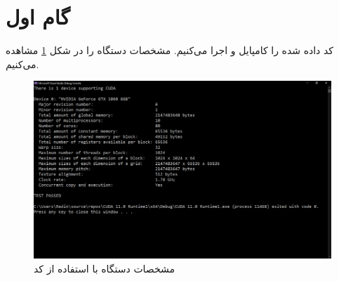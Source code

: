 \documentclass{HW}
\begin{document}
\pagestyle{pages}
\thispagestyle{first_page}

\section{گام اول}

کد  داده شده را کامپایل و اجرا می‌کنیم. مشخصات دستگاه را در شکل
\ref{fig:query}
مشاهده می‌کنیم.

\begin{figure}[ht!]
\begin{center}
	\includegraphics[width=15cm]{images/query}
\end{center}
\caption{مشخصات دستگاه با استفاده از کد }
\label{fig:query}
\end{figure}

\end{document}
